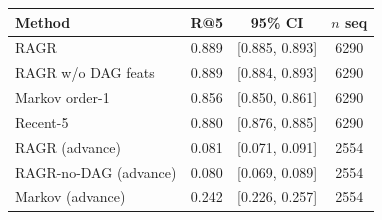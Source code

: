 \begin{tabular}{lccc}
\toprule
Method & R@5 & 95\% CI & $n$ seq \\
\midrule
RAGR & 0.889 & [0.885, 0.893] & 6290 \\
RAGR w/o DAG feats & 0.889 & [0.884, 0.893] & 6290 \\
Markov order-1 & 0.856 & [0.850, 0.861] & 6290 \\
Recent-5 & 0.880 & [0.876, 0.885] & 6290 \\
RAGR (advance) & 0.081 & [0.071, 0.091] & 2554 \\
RAGR-no-DAG (advance) & 0.080 & [0.069, 0.089] & 2554 \\
Markov (advance) & 0.242 & [0.226, 0.257] & 2554 \\
\bottomrule
\end{tabular}
